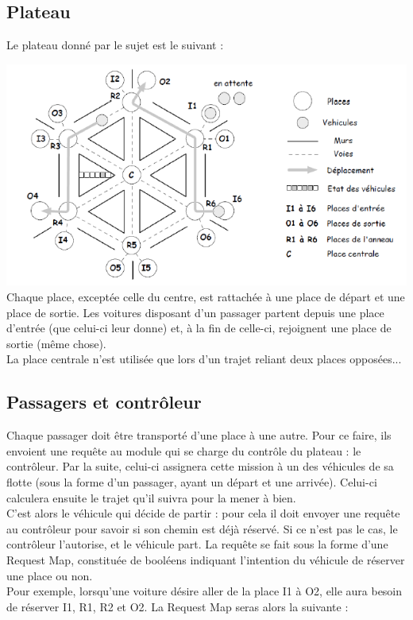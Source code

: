 \documentclass[a4paper, titlepage]{report}
\begin{document}
\subsection{Plateau}
Le plateau donné par le sujet est le suivant :
\vspace{0.5cm}

\includegraphics[frame]{Images/Plateau}
\vspace{0.5cm}
\\
Chaque place, exceptée celle du centre, est rattachée à une place de départ et une place de sortie. Les voitures disposant d'un passager partent depuis une place d'entrée (que celui-ci leur donne) et, à la fin de celle-ci, rejoignent une place de sortie (même chose).\\
La place centrale n'est utilisée que lors d'un trajet reliant deux places opposées...
\subsection{Passagers et contrôleur}
Chaque passager doit être transporté d'une place à une autre. Pour ce faire, ils envoient une requête au module qui se charge du contrôle du plateau : le contrôleur. Par la suite, celui-ci assignera cette mission à un des véhicules de sa flotte (sous la forme d'un passager, ayant un départ et une arrivée). Celui-ci calculera ensuite le trajet qu'il suivra pour la mener à bien.\\
C'est alors le véhicule qui décide de partir : pour cela il doit envoyer une requête au contrôleur pour savoir si son chemin est déjà réservé. Si ce n'est pas le cas, le contrôleur l'autorise, et le véhicule part. La requête se fait sous la forme d'une Request Map, constituée de booléens indiquant l'intention du véhicule de réserver une place ou non.\\
Pour exemple, lorsqu'une voiture désire aller de la place I1 à O2, elle aura besoin de réserver I1, R1, R2 et O2. La Request Map seras alors la suivante :
\vspace{0.5cm}
\end{document}
